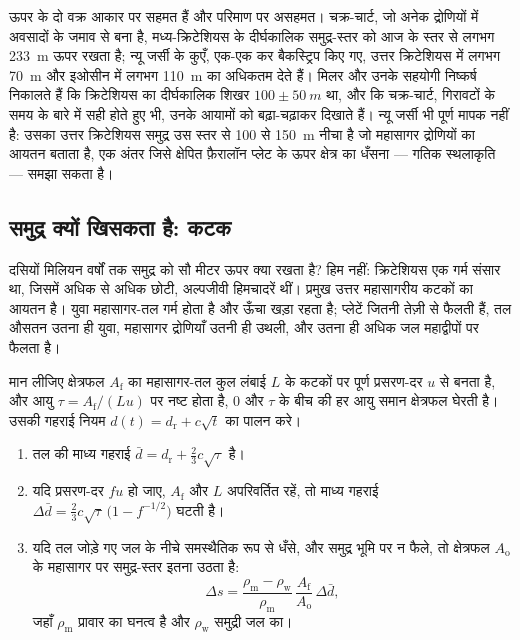 ऊपर के दो वक्र आकार पर सहमत हैं और परिमाण पर असहमत। चक्र-चार्ट, जो अनेक द्रोणियों में
अवसादों के जमाव से बना है, मध्य-क्रिटेशियस के दीर्घकालिक समुद्र-स्तर को आज के स्तर से
लगभग \qty{233}{m} ऊपर रखता है; न्यू जर्सी के कुएँ, एक-एक कर बैकस्ट्रिप किए गए, उत्तर क्रिटेशियस में लगभग
\qty{70}{m} और इओसीन में लगभग \qty{110}{m} का अधिकतम देते हैं। मिलर और उनके
सहयोगी निष्कर्ष निकालते हैं कि क्रिटेशियस का दीर्घकालिक शिखर $100 \pm \qty{50}{m}$ था, और कि
चक्र-चार्ट, गिरावटों के समय के बारे में सही होते हुए भी, उनके आयामों को बढ़ा-चढ़ाकर दिखाते हैं। न्यू जर्सी भी
पूर्ण मापक नहीं है: उसका उत्तर क्रिटेशियस समुद्र उस स्तर से 100 से \qty{150}{m} नीचा है जो
महासागर द्रोणियों का आयतन बताता है, एक अंतर जिसे क्षेपित फ़ैरालॉन प्लेट के ऊपर
क्षेत्र का धँसना --- गतिक स्थलाकृति --- समझा सकता है।

\subsection*{समुद्र क्यों खिसकता है: कटक}

दसियों मिलियन वर्षों तक समुद्र को सौ मीटर ऊपर क्या रखता है? हिम नहीं: क्रिटेशियस
एक गर्म संसार था, जिसमें अधिक से अधिक छोटी, अल्पजीवी हिमचादरें थीं। प्रमुख उत्तर
महासागरीय कटकों का आयतन है। युवा महासागर-तल गर्म होता है और ऊँचा खड़ा रहता है; प्लेटें जितनी तेज़ी से फैलती हैं,
तल औसतन उतना ही युवा, महासागर द्रोणियाँ उतनी ही उथली, और उतना ही अधिक जल
महाद्वीपों पर फैलता है।

\begin{proposition}[समुद्र-स्तर और प्रसरण-दर]\label{prop:b2:phanerozoic-earth:ridge}
मान लीजिए क्षेत्रफल $A_{\text{f}}$ का महासागर-तल कुल लंबाई $L$ के कटकों पर पूर्ण
प्रसरण-दर $u$ से बनता है, और आयु $\tau = A_{\text{f}}/(Lu)$ पर नष्ट होता है, 0
और $\tau$ के बीच की हर आयु समान क्षेत्रफल घेरती है। उसकी गहराई नियम $d(t) = d_{\text{r}} + c\sqrt t$ का पालन करे।
\begin{enumerate}
  \item तल की माध्य गहराई $\bar d = d_{\text{r}} + \tfrac23 c\sqrt\tau$ है।
  \item यदि प्रसरण-दर $fu$ हो जाए, $A_{\text{f}}$ और $L$ अपरिवर्तित रहें, तो माध्य
        गहराई $\Delta\bar d = \tfrac23 c\sqrt\tau\,\bigl(1 - f^{-1/2}\bigr)$ घटती है।
  \item यदि तल जोड़े गए जल के नीचे समस्थैतिक रूप से धँसे, और समुद्र भूमि पर न
        फैले, तो क्षेत्रफल $A_{\text{o}}$ के महासागर पर समुद्र-स्तर इतना उठता है:
        \[
        \Delta s = \frac{\rho_{\text{m}} - \rho_{\text{w}}}{\rho_{\text{m}}}\,
        \frac{A_{\text{f}}}{A_{\text{o}}}\,\Delta\bar d ,
        \]
        जहाँ $\rho_{\text{m}}$ प्रावार का घनत्व है और $\rho_{\text{w}}$ समुद्री जल का।
\end{enumerate}
\end{proposition}

